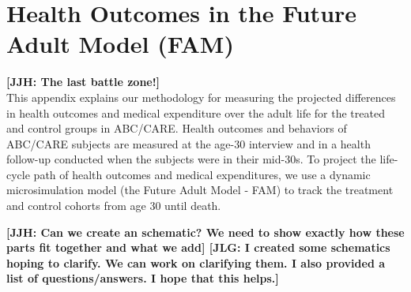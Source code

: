\section{Health Outcomes in the Future Adult Model (FAM)} \label{appendix:health}

\noindent \textbf{[JJH: The last battle zone!]}\\

This appendix explains our methodology for measuring the projected differences in health outcomes and medical expenditure over the adult life for the treated and control groups in ABC/CARE.
Health outcomes and behaviors of ABC/CARE subjects are measured at the age-30 interview and in a health follow-up conducted when the subjects were in their mid-30s.
To project the life-cycle path of health outcomes and medical expenditures, we use a dynamic microsimulation model (the Future Adult Model - FAM) to track the treatment and control cohorts from age 30 until death.

\noindent \textbf{[JJH: Can we create an schematic? We need to show exactly how these parts fit together and what we add] [JLG: I created some schematics hoping to clarify. We can work on clarifying them. I also provided a list of questions/answers. I hope that this helps.]}





%

